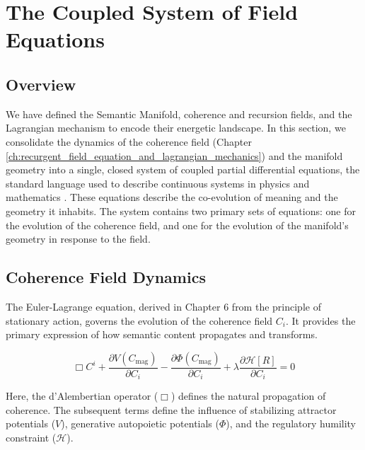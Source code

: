 \chapter{The Coupled System of Field Equations}
\label{ch:the_coupled_system_of_field_equations}


\section{Overview}

We have defined the Semantic Manifold, coherence and recursion fields, and the Lagrangian mechanism to encode their energetic landscape. In this section, we consolidate the dynamics of the coherence field (Chapter \ref{ch:recurgent_field_equation_and_lagrangian_mechanics}) and the manifold geometry into a single, closed system of coupled partial differential equations, the standard language used to describe continuous systems in physics and mathematics \autocite{Evans2010}. These equations describe the co-evolution of meaning and the geometry it inhabits. The system contains two primary sets of equations: one for the evolution of the coherence field, and one for the evolution of the manifold's geometry in response to the field.


\section{Coherence Field Dynamics}
\label{sec:coherence_field_dynamics}

The Euler-Lagrange equation, derived in Chapter 6 from the principle of stationary action, governs the evolution of the coherence field \(C_i\). It provides the primary expression of how semantic content propagates and transforms.

\begin{equation}
\Box C^i + \frac{\partial V(C_{\mathrm{mag}})}{\partial C_i} - \frac{\partial \Phi(C_{\mathrm{mag}})}{\partial C_i} + \lambda \frac{\partial \mathcal{H}[R]}{\partial C_i} = 0
\end{equation}

Here, the d'Alembertian operator (\(\Box\)) defines the natural propagation of coherence. The subsequent terms define the influence of stabilizing attractor potentials (\(V\)), generative autopoietic potentials (\(\Phi\)), and the regulatory humility constraint (\(\mathcal{H}\)).

